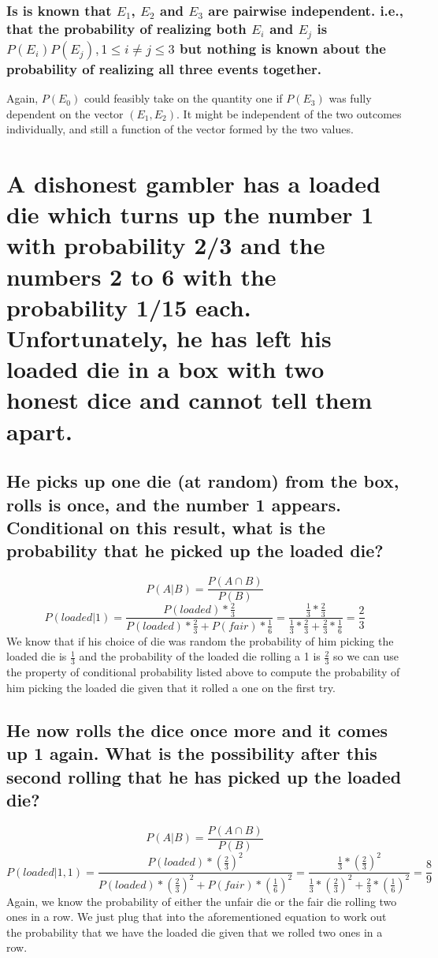\documentclass[11pt, oneside]{book}   	%
\begin{document}
\subsubsection{Is is known that $E_1$, $E_2$ and $E_3$ are pairwise independent.  i.e., that the probability of realizing both $E_i$ and $E_j$ is $P(E_i)P(E_j), 1 \leq i \neq j \leq 3$ but nothing is known about the probability of realizing all three events together.}
Again, $P(E_0)$ could feasibly take on the quantity one if $P(E_3)$ was fully dependent on the vector $(E_1,E_2)$.  It might be independent of the two outcomes individually, and still a function of the vector formed by the two values.

\section{A dishonest gambler has a loaded die which turns up the number 1 with probability 2/3 and the numbers 2 to 6 with the probability 1/15 each.  Unfortunately, he has left his loaded die in a box with two honest dice and cannot tell them apart.}
\subsection{He picks up one die (at random) from the box, rolls is once, and the number 1 appears.  Conditional on this result, what is the probability that he picked up the loaded die?}
$$P(A|B)=\frac{P(A \cap B)}{P(B)}$$
$$P(loaded|1)=\frac{P(loaded)*\frac{2}{3}}{P(loaded)*\frac{2}{3}+P(fair)*\frac{1}{6}}=\frac{\frac{1}{3}*\frac{2}{3}}{\frac{1}{3}*\frac{2}{3}+\frac{2}{3}*\frac{1}{6}}=\frac{2}{3}$$
We know that if his choice of die was random the probability of him picking the loaded die is $\frac{1}{3}$ and the probability of the loaded die rolling a 1 is $\frac{2}{3}$ so we can use the property of conditional probability listed above to compute the probability of him picking the loaded die given that it rolled a one on the first try.
\subsection{He now rolls the dice once more and it comes up 1 again.  What is the possibility after this second rolling that he has picked up the loaded die?}
$$P(A|B)=\frac{P(A \cap B)}{P(B)}$$
$$P(loaded|1,1)=\frac{P(loaded)*(\frac{2}{3})^2}{P(loaded)*(\frac{2}{3})^2+P(fair)*(\frac{1}{6})^2}=\frac{\frac{1}{3}*(\frac{2}{3})^2}{\frac{1}{3}*(\frac{2}{3})^2+\frac{2}{3}*(\frac{1}{6})^2}=\frac{8}{9}$$
Again, we know the probability of either the unfair die or the fair die rolling two ones in a row.  We just plug that into the aforementioned equation to work out the probability that we have the loaded die given that we rolled two ones in a row.
\end{document}
